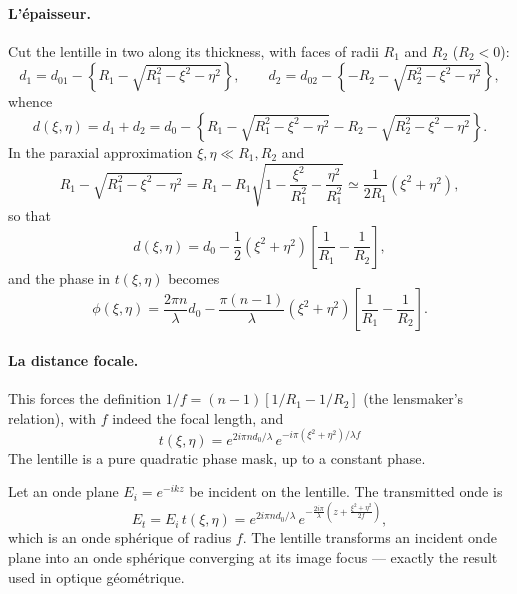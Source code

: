 \paragraph{L'épaisseur.} Cut the lentille in two along its thickness, with faces
of radii $R_1$ and $R_2$ ($R_2 < 0$):
\begin{equation*}
  d_1 = d_{01} - \left\{ R_1 - \sqrt{R_1^2 - \xi^2 - \eta^2}\right\},
  \qquad
  d_2 = d_{02} - \left\{ -R_2 - \sqrt{R_2^2 - \xi^2 - \eta^2}\right\},
\end{equation*}
whence
\begin{equation*}
  d(\xi,\eta) = d_1 + d_2 = d_0 - \left\{
    R_1 - \sqrt{R_1^2 - \xi^2 - \eta^2} - R_2 - \sqrt{R_2^2 - \xi^2 - \eta^2}
  \right\}.
\end{equation*}
In the paraxial approximation $\xi, \eta \ll R_1, R_2$ and
\begin{equation*}
  R_1 - \sqrt{R_1^2 - \xi^2 - \eta^2}
  = R_1 - R_1\sqrt{1 - \frac{\xi^2}{R_1^2} - \frac{\eta^2}{R_1^2}}
  \simeq \frac{1}{2R_1}\left(\xi^2 + \eta^2\right),
\end{equation*}
so that
\begin{equation*}
  d(\xi,\eta) = d_0 - \frac{1}{2}\left(\xi^2 + \eta^2\right)
                \left[\frac{1}{R_1} - \frac{1}{R_2}\right],
\end{equation*}
and the phase in $t(\xi,\eta)$ becomes
\begin{equation*}
  \phi(\xi,\eta) = \frac{2\pi n}{\lambda} d_0
    - \frac{\pi(n-1)}{\lambda}\left(\xi^2+\eta^2\right)
      \left[\frac{1}{R_1} - \frac{1}{R_2}\right].
\end{equation*}

\paragraph{La distance focale.} This forces the definition
$1/f = (n-1)\left[1/R_1 - 1/R_2\right]$ (the lensmaker's relation), with $f$
indeed the focal length, and
\begin{equation*}
  \boxed{\;
    t(\xi,\eta) = e^{2i\pi n d_0/\lambda}\,
                  e^{-i\pi(\xi^2+\eta^2)/\lambda f}
  \;}
\end{equation*}
The lentille is a pure quadratic phase mask, up to a constant phase.

\begin{example}
  Let an onde plane $E_i = e^{-ikz}$ be incident on the lentille. The
  transmitted onde is
  \[
    E_t = E_i\, t(\xi,\eta)
        = e^{2i\pi n d_0/\lambda}\,
          e^{-\frac{2i\pi}{\lambda}\left(z + \frac{\xi^2+\eta^2}{2f}\right)},
  \]
  which is an onde sphérique of radius $f$. The lentille transforms an incident
  onde plane into an onde sphérique converging at its image focus --- exactly
  the result used in optique géométrique.
\end{example}

